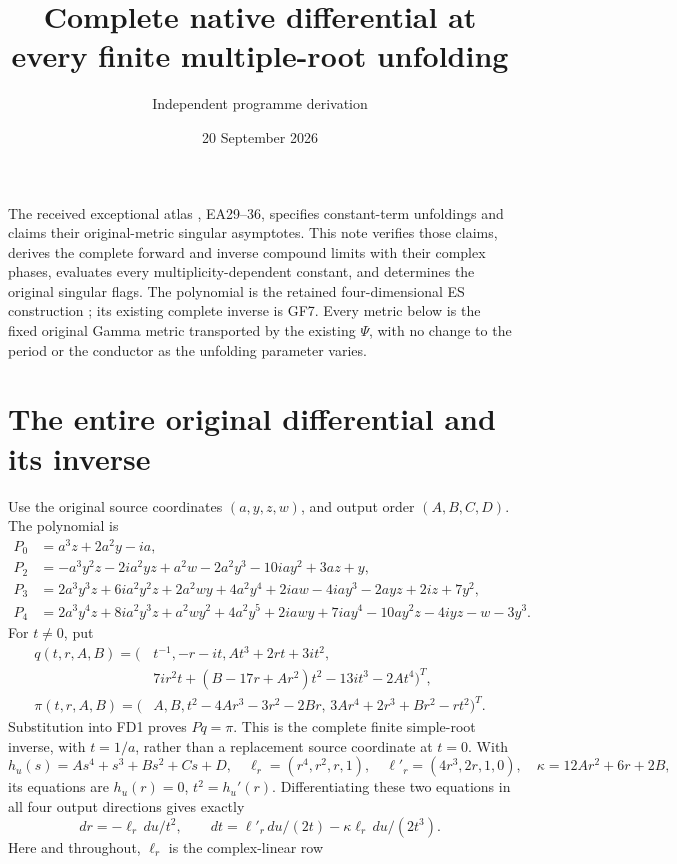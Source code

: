 \documentclass[11pt]{article}
\title{Complete native differential at every finite multiple-root unfolding}
\author{Independent programme derivation}
\date{20 September 2026}
\begin{document}
\maketitle
The received exceptional atlas \cite{Atlas}, EA29--36, specifies
constant-term unfoldings and claims their original-metric singular
asymptotes. This note verifies those claims, derives the complete
forward and inverse compound limits with their complex phases,
evaluates every multiplicity-dependent constant, and determines
the original singular flags. The polynomial is the retained
four-dimensional ES construction \cite{ES}; its existing complete
inverse is GF7. Every metric below is the fixed original Gamma
metric transported by the existing \(\Psi\), with no change to
the period or the conductor as the unfolding parameter varies.

\section{The entire original differential and its inverse}
Use the original source coordinates \((a,y,z,w)\), and output
order \((A,B,C,D)\). The polynomial is
\[
\begin{aligned}
P_0&=a^3z+2a^2y-ia,\\
P_2&=-a^3y^2z-2ia^2yz+a^2w-2a^2y^3-10iay^2+3az+y,\\
P_3&=2a^3y^3z+6ia^2y^2z+2a^2wy+4a^2y^4
       +2iaw-4iay^3-2ayz+2iz+7y^2,\\
P_4&=2a^3y^4z+8ia^2y^3z+a^2wy^2+4a^2y^5
       +2iawy+7iay^4-10ay^2z-4iyz-w-3y^3.
\end{aligned}\tag{FD1}
\]
For \(t\ne0\), put
\[
\begin{aligned}
q(t,r,A,B)=\bigl(&t^{-1},-r-it,At^3+2rt+3it^2,\\
 &7ir^2t+(B-17r+Ar^2)t^2-13it^3-2At^4\bigr)^T,\\
\pi(t,r,A,B)=\bigl(&A,B,t^2-4Ar^3-3r^2-2Br,\,
                      3Ar^4+2r^3+Br^2-rt^2\bigr)^T.
\end{aligned}\tag{FD2}
\]
Substitution into FD1 proves \(Pq=\pi\). This is the complete
finite simple-root inverse, with \(t=1/a\), rather than a
replacement source coordinate at \(t=0\). With
\[
 h_u(s)=As^4+s^3+Bs^2+Cs+D,\quad
 \ell_r=(r^4,r^2,r,1),\quad \ell'_r=(4r^3,2r,1,0),\quad
 \kappa=12Ar^2+6r+2B,
 \tag{FD3}
\]
its equations are \(h_u(r)=0\), \(t^2=h_u'(r)\).
Differentiating these two equations in all four output directions
gives exactly
\[
 dr=-\ell_r\,du/t^2,\qquad
 dt=\ell'_r\,du/(2t)-\kappa\ell_r\,du/(2t^3).
 \tag{FD4}
\]
Here and throughout, \(\ell_r\) is the complex-linear row
\end{document}
